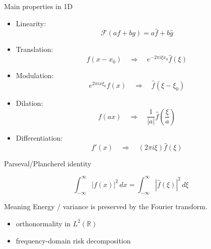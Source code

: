 \documentclass[aspectratio=169]{beamer}
\begin{document}
\begin{frame}{Main properties in 1D}

\begin{itemize}
    \item Linearity:
    \[
    \mathcal{F}(af+bg)=a\hat f+b\hat g
    \]

    \item Translation:
    \[
    f(x-x_0)\quad\Longrightarrow\quad 
    e^{-2\pi i\xi x_0}\hat f(\xi)
    \]

    \item Modulation:
    \[
    e^{2\pi i x \xi_0}f(x)
    \quad\Longrightarrow\quad
    \hat f(\xi-\xi_0)
    \]

    \item Dilation:
    \[
    f(ax)\quad\Longrightarrow\quad
    \frac{1}{|a|}\hat f\!\left(\frac{\xi}{a}\right)
    \]

    \item Differentiation:
    \[
    f'(x)\quad\Longrightarrow\quad
    (2\pi i\xi)\hat f(\xi)
    \]
\end{itemize}

\end{frame}

\begin{frame}{Parseval/Plancherel identity}

\[
\int_{-\infty}^{\infty} |f(x)|^2\,dx
=
\int_{-\infty}^{\infty} |\hat f(\xi)|^2\,d\xi
\]
\pause
\begin{block}{Meaning}
Energy / variance is preserved by the Fourier transform.
\end{block}

\begin{itemize}
    \item orthonormality in $L^2(\mathbb{R})$
    \item frequency-domain risk decomposition
\end{itemize}

\end{frame}
\end{document}
